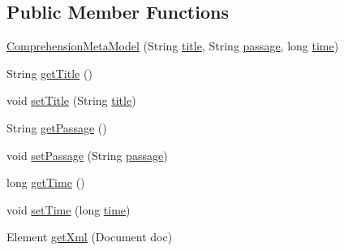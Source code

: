 \subsection*{Public Member Functions}
\begin{DoxyCompactItemize}
\item 
\hyperlink{classorg_1_1buildmlearn_1_1toolkit_1_1templates_1_1ComprehensionMetaModel_aefd44e9d1b875365c8194c4a3ab30866}{Comprehension\+Meta\+Model} (String \hyperlink{classorg_1_1buildmlearn_1_1toolkit_1_1templates_1_1ComprehensionMetaModel_a904f81c4bb8b842a42b4dd9ff6c7af57}{title}, String \hyperlink{classorg_1_1buildmlearn_1_1toolkit_1_1templates_1_1ComprehensionMetaModel_af55829e04fda344cafd3718fe3679369}{passage}, long \hyperlink{classorg_1_1buildmlearn_1_1toolkit_1_1templates_1_1ComprehensionMetaModel_adb29204102c4f3272ae85270899e40b8}{time})
\item 
String \hyperlink{classorg_1_1buildmlearn_1_1toolkit_1_1templates_1_1ComprehensionMetaModel_a8f32fe6cdd84e0409825859664983929}{get\+Title} ()
\item 
void \hyperlink{classorg_1_1buildmlearn_1_1toolkit_1_1templates_1_1ComprehensionMetaModel_ad370d83e34347f595a2faf71f81cb7a4}{set\+Title} (String \hyperlink{classorg_1_1buildmlearn_1_1toolkit_1_1templates_1_1ComprehensionMetaModel_a904f81c4bb8b842a42b4dd9ff6c7af57}{title})
\item 
String \hyperlink{classorg_1_1buildmlearn_1_1toolkit_1_1templates_1_1ComprehensionMetaModel_a9719c811b683786fb5d58cb202b76aed}{get\+Passage} ()
\item 
void \hyperlink{classorg_1_1buildmlearn_1_1toolkit_1_1templates_1_1ComprehensionMetaModel_afa9f4bf2e1cbf341c7f20022ca12a399}{set\+Passage} (String \hyperlink{classorg_1_1buildmlearn_1_1toolkit_1_1templates_1_1ComprehensionMetaModel_af55829e04fda344cafd3718fe3679369}{passage})
\item 
long \hyperlink{classorg_1_1buildmlearn_1_1toolkit_1_1templates_1_1ComprehensionMetaModel_ad0a05984ec2f99de462935e4acb6383f}{get\+Time} ()
\item 
void \hyperlink{classorg_1_1buildmlearn_1_1toolkit_1_1templates_1_1ComprehensionMetaModel_ae28208ef5c32b38c19802c99e1e60d75}{set\+Time} (long \hyperlink{classorg_1_1buildmlearn_1_1toolkit_1_1templates_1_1ComprehensionMetaModel_adb29204102c4f3272ae85270899e40b8}{time})
\item 
Element \hyperlink{classorg_1_1buildmlearn_1_1toolkit_1_1templates_1_1ComprehensionMetaModel_a9bf9c280217305edb730a0a011b13591}{get\+Xml} (Document doc)
\end{DoxyCompactItemize}
